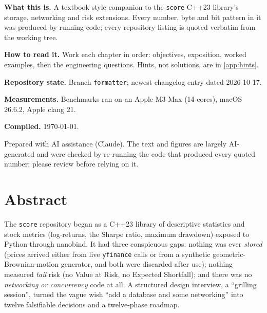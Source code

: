\begin{titlepage}
\begin{minipage}[t]{0.55\linewidth}
\color{muted}\small
\textbf{\color{fg}What this is.} A textbook-style companion to the \texttt{score} C++23 library's
storage, networking and risk extensions. Every number, byte and bit pattern in it was produced by
running code; every repository listing is quoted verbatim from the working tree.\par
\vspace{6pt}
\textbf{\color{fg}How to read it.} Work each chapter in order: objectives, exposition, worked examples,
then the engineering questions. Hints, not solutions, are in \cref{app:hints}.
\end{minipage}\hfill
\begin{minipage}[t]{0.38\linewidth}
\color{muted}\small
\textbf{\color{fg}Repository state.} Branch \texttt{formatter}; newest changelog entry dated 2026-10-17.\par
\vspace{6pt}
\textbf{\color{fg}Measurements.} Benchmarks ran on an Apple M3 Max (14 cores), macOS 26.6.2, Apple clang 21.\par
\vspace{6pt}
\textbf{\color{fg}Compiled.} \today.
\end{minipage}
\vfill
{\color{muted}\footnotesize Prepared with AI assistance (Claude). The text and figures are largely AI-generated and were checked by
re-running the code that produced every quoted number; please review before relying on it.}
\end{titlepage}

\chapter*{Abstract}
The \texttt{score} repository began as a C++23 library of descriptive statistics and stock metrics
(log-returns, the Sharpe ratio, maximum drawdown) exposed to Python through nanobind. It had three
conspicuous gaps: nothing was ever \emph{stored} (prices arrived either from live \texttt{yfinance}
calls or from a synthetic geometric-Brownian-motion generator, and both were discarded after use);
nothing measured \emph{tail} risk (no Value at Risk, no Expected Shortfall); and there was no
\emph{networking or concurrency} code at all. A structured design interview, a ``grilling session'',
turned the vague wish ``add a database and some networking'' into twelve falsifiable decisions and a
twelve-phase roadmap.

